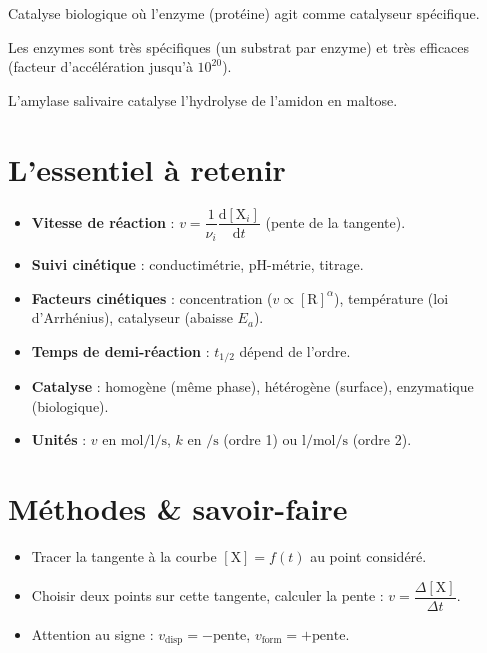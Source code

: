 \begin{definition}
Catalyse biologique où l'enzyme (protéine) agit comme catalyseur spécifique.
\end{definition}

\begin{propriete}
Les enzymes sont très spécifiques (un substrat par enzyme) et très efficaces (facteur d'accélération jusqu'à $10^{20}$).
\end{propriete}

\begin{exemple}
L'amylase salivaire catalyse l'hydrolyse de l'amidon en maltose.
\end{exemple}

\section{L'essentiel à retenir}

\begin{synthese}
\begin{itemize}
\item \textbf{Vitesse de réaction} : $v = \dfrac{1}{\nu_i}\dfrac{\mathrm{d}[\mathrm{X}_i]}{\mathrm{d}t}$ (pente de la tangente).
\item \textbf{Suivi cinétique} : conductimétrie, pH-métrie, titrage.
\item \textbf{Facteurs cinétiques} : concentration ($v \propto [\mathrm{R}]^\alpha$), température (loi d'Arrhénius), catalyseur (abaisse $E_a$).
\item \textbf{Temps de demi-réaction} : $t_{1/2}$ dépend de l'ordre.
\item \textbf{Catalyse} : homogène (même phase), hétérogène (surface), enzymatique (biologique).
\item \textbf{Unités} : $v$ en $\si{\mol\per\litre\per\second}$, $k$ en $\si{\per\second}$ (ordre 1) ou $\si{\litre\per\mol\per\second}$ (ordre 2).
\end{itemize}
\end{synthese}

\section{Méthodes \& savoir-faire}

\begin{itemize}
\item Tracer la tangente à la courbe $[\mathrm{X}] = f(t)$ au point considéré.
\item Choisir deux points sur cette tangente, calculer la pente : $v = \dfrac{\Delta[\mathrm{X}]}{\Delta t}$.
\item Attention au signe : $v_{\text{disp}} = -\text{pente}$, $v_{\text{form}} = +\text{pente}$.
\end{itemize}

